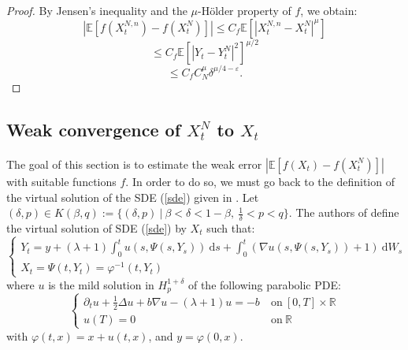 \documentclass[11pt]{article}
\newcommand{\R}{\mathbb{R}}
\newcommand{\E}{\mathbb{E}}
\newcommand{\di}{\mathrm{d}}
\begin{document}
        \begin{proof}
            By Jensen's inequality and the $\mu$-Hölder property of $f$, we obtain:
            \begin{equation*}
            \left|\E\left[f\left(X_t^{N,n}\right)-f\left(X_t^N\right)\right]\right| \leq C_f  \E\left[\left|X_t^{N,n}-X_t^N\right|^\mu\right]
            \end{equation*}
            \begin{equation*}
             \leq  C_f  \E\left[\left|Y_t-Y_t^N\right|^2\right]^{\mu/2}
            \end{equation*}
            \begin{equation*}
            \leq C_f  C_N^\mu\delta^{\mu/4-\varepsilon}.
            \end{equation*}
        \end{proof}
    
    \subsection{Weak convergence of $X^{N}_t$ to $X_t$}
        \paragraph{}
        The goal of this section is to estimate the weak error $\left|\E\left[f\left(X_t\right)-f\left(X_t^N\right)\right]\right|$ with suitable functions $f$. In order to do so, we must go back to the definition of the virtual solution of the SDE (\ref{sde}) given in \cite{Fla-Iss-Rus-2017}. Let $(\delta,p)\in K(\beta,q):=\{(\delta,p)\ |\ \beta<\delta<1-\beta,\ \frac{1}{\delta}<p<q\}$. The authors of \cite{Fla-Iss-Rus-2017} define the virtual solution of SDE (\ref{sde}) by $X_t$ such that:
        \begin{equation}\label{virtual}
        \begin{cases}
        Y_t = y + (\lambda+1)\int_0^t u(s,\Psi\left(s,Y_s\right))\ \di s +\int_0^t (\nabla u(s,\Psi\left(s,Y_s\right))+1)\ \di W_s \\X_t = \Psi(t,Y_t) = \varphi^{-1}(t,Y_t)
        \end{cases}
        \end{equation}
        where $u$ is the mild solution in $H_p^{1+\delta}$ of the following parabolic PDE:
        \begin{equation}\label{pde}
        \begin{cases}
        \partial_t u + \frac{1}{2}\Delta u + b\nabla u - (\lambda+1)u = -b\ &\mathrm{on}\ [0,T]\times\R\\
        u(T) = 0\ &\mathrm{on}\ \R
        \end{cases}
        \end{equation}
        with $\varphi(t,x) = x + u(t,x)$, and $y=\varphi(0,x)$.
        
\end{document}
